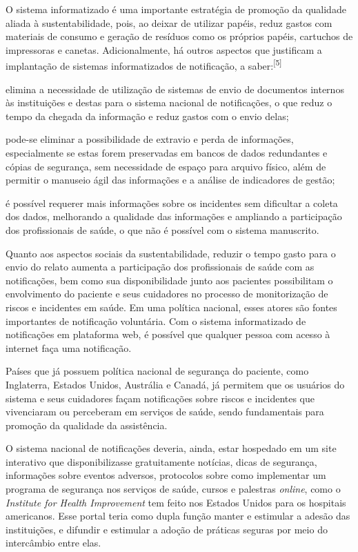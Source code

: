 \documentclass{article}
\begin{document}
O sistema informatizado é uma importante estratégia de promoção da qualidade
aliada à
sustentabilidade, pois, ao deixar de utilizar papéis, reduz gastos com materiais
de consumo
e geração de resíduos como os próprios papéis, cartuchos de impressoras e
canetas.
Adicionalmente, há outros aspectos que justificam a implantação de sistemas
informatizados
de notificação, a saber:\textsuperscript{[}\textsuperscript{5}\textsuperscript{]}

elimina a necessidade de utilização de sistemas de envio de documentos internos
às
instituições e destas para o sistema nacional de notificações, o que reduz o
tempo da
chegada da informação e reduz gastos com o envio delas;

pode-se eliminar a possibilidade de extravio e perda de informações,
especialmente se
estas forem preservadas em bancos de dados redundantes e cópias de segurança,
sem
necessidade de espaço para arquivo físico, além de permitir o manuseio ágil das
informações e a análise de indicadores de gestão;

é possível requerer mais informações sobre os incidentes sem dificultar a coleta
dos
dados, melhorando a qualidade das informações e ampliando a participação dos
profissionais de saúde, o que não é possível com o sistema manuscrito.

Quanto aos aspectos sociais da sustentabilidade, reduzir o tempo gasto para o
envio do
relato aumenta a participação dos profissionais de saúde com as notificações,
bem como sua
disponibilidade junto aos pacientes possibilitam o envolvimento do paciente e
seus
cuidadores no processo de monitorização de riscos e incidentes em saúde. Em uma
política
nacional, esses atores são fontes importantes de notificação voluntária. Com o
sistema
informatizado de notificações em plataforma web, é possível que qualquer pessoa
com acesso à
internet faça uma notificação.

Países que já possuem política nacional de segurança do paciente, como
Inglaterra, Estados
Unidos, Austrália e Canadá, já permitem que os usuários do sistema e seus
cuidadores façam
notificações sobre riscos e incidentes que vivenciaram ou perceberam em serviços
de saúde,
sendo fundamentais para promoção da qualidade da assistência.

O sistema nacional de notificações deveria, ainda, estar hospedado em um site
interativo
que disponibilizasse gratuitamente notícias, dicas de segurança, informações
sobre eventos
adversos, protocolos sobre como implementar um programa de segurança nos
serviços de saúde,
cursos e palestras \textit{online}, como o \textit{Institute for Health
Improvement}
tem feito nos Estados Unidos para os hospitais americanos. Esse
portal teria como dupla função manter e estimular a adesão das instituições, e
difundir e
estimular a adoção de práticas seguras por meio do intercâmbio entre elas.
\end{document}
